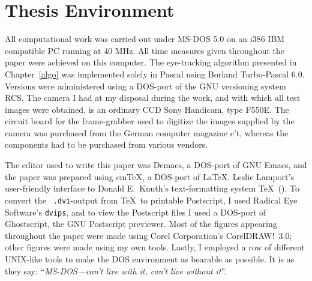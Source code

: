 
\section{Thesis Environment}
\label{intro:env}

All computational work was carried out under MS-DOS 5.0 on an i386 IBM
compatible PC running at 40 MHz.  All time measures given throughout
the paper were achieved on this computer.  The eye-tracking algorithm
{\octopus} presented in Chapter~\ref{algo} was implemented solely in
Pascal using Borland Turbo-Pascal 6.0.  Versions were administered
using a DOS-port of the GNU versioning system RCS.  The camera I had
at my disposal during the work, and with which all test images were
obtained, is an ordinary CCD Sony Handicam, type F550E.  The circuit
board for the frame-grabber used to digitize the images supplied by
the camera was purchased from the German computer magazine {\sf
  c't\/}, whereas the components had to be purchased from various
vendors.

The editor used to write this paper was Demacs, a DOS-port of GNU
Emacs, and the paper was prepared using em\TeX, a DOS-port of \LaTeX,
Leslie Lamport's user-friendly interface to Donald E.\ Knuth's
text-formatting system \TeX\ (\cite{lamport}).  To convert the {\tt
  .dvi}-output from \TeX\ to printable Postscript, I used Radical Eye
Software's {\tt dvips}, and to view the Postscript files I used a
DOS-port of Ghostscript, the GNU Postscript previewer.  Most of the
figures appearing throughout the paper were made using Corel
Corporation's CorelDRAW!\ 3.0; other figures were made using my own
tools.  Lastly, I employed a row of different UNIX-like tools to make
the DOS environment as bearable as possible.  It is as they say:
``{\em MS-DOS---can't live with it, can't live without it\/}''.
